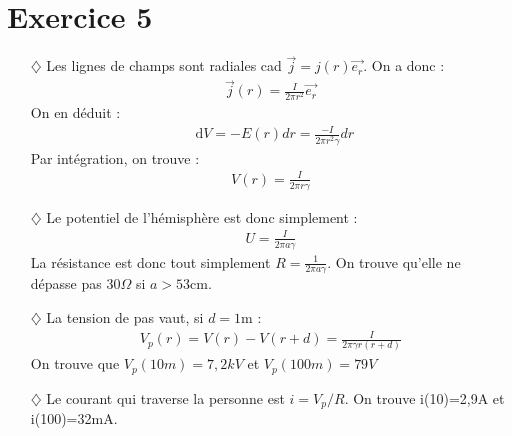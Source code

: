 \documentclass{report}
\newcommand*\dif{\mathop{}\!\mathrm{d}}
\begin{document}
\section*{Exercice 5}

\begin{itemize}

	\item[$\diamondsuit$] Les lignes de champs sont radiales cad $\vec{j}=j(r)\vec{e_r}$. On a donc :
\begin{align*}
	\vec{j}(r)=\frac{I}{2\pi r^2}\vec{e_r}
\end{align*}
On en déduit :
\begin{align*}
	\dif V=-E(r)dr=\frac{-I}{2\pi r^2\gamma}dr
\end{align*}
Par intégration, on trouve :
\begin{align*}
	V(r)=\frac{I}{2\pi r\gamma}
\end{align*}

	\item[$\diamondsuit$] Le potentiel de l'hémisphère est donc simplement :
\begin{align*}
	U=\frac{I}{2\pi a\gamma}
\end{align*}
La résistance est donc tout simplement $R=\frac{1}{2\pi a \gamma}$. On trouve qu'elle ne dépasse pas 30$\Omega$ si $a>53$cm.

	\item[$\diamondsuit$] La tension de pas vaut, si $d=1$m :
	\begin{align*}
		V_p(r)=V(r)-V(r+d)=\frac{I}{2\pi \gamma r(r+d)}
	\end{align*}
On trouve que $V_p(10m)=7,2kV$ et  $V_p(100m)=79V$

	\item[$\diamondsuit$] Le courant qui traverse la personne est $i=V_p/R$. On trouve i(10)=2,9A et i(100)=32mA.
\end{itemize}
\end{document}
